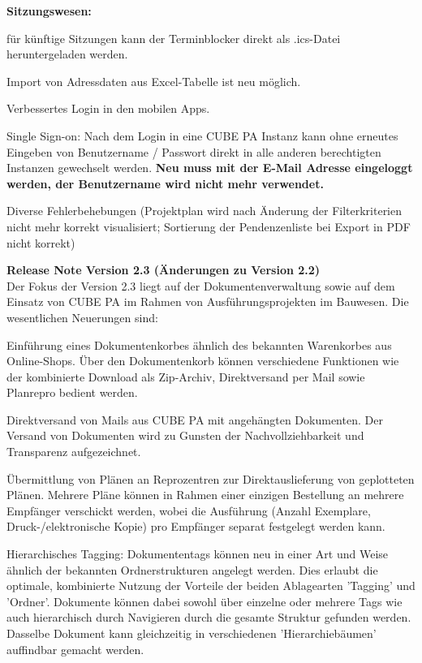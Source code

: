\textbf{Sitzungswesen:}
\begin{compactitem}
  \item für künftige Sitzungen kann der Terminblocker direkt als .ics-Datei heruntergeladen werden.
	\item Import von Adressdaten aus Excel-Tabelle ist neu möglich.
	\item Verbessertes Login in den mobilen Apps.
	\item Single Sign-on: Nach dem Login in eine CUBE PA Instanz kann ohne erneutes Eingeben von Benutzername / Passwort direkt in alle anderen berechtigten Instanzen gewechselt werden. \textbf{Neu muss mit der E-Mail Adresse eingeloggt werden, der Benutzername wird nicht mehr verwendet.}
	\item Diverse Fehlerbehebungen (Projektplan wird nach Änderung der Filterkriterien nicht mehr korrekt visualisiert; Sortierung der Pendenzenliste bei Export in PDF nicht korrekt)	
\end{compactitem}

\vspace{\baselineskip}

\textbf{Release Note Version 2.3 (Änderungen zu Version 2.2)} \\
Der Fokus der Version 2.3 liegt auf der Dokumentenverwaltung sowie auf dem Einsatz von CUBE PA im Rahmen von Ausführungsprojekten im Bauwesen. Die wesentlichen Neuerungen sind:

\begin{compactitem}
	\item Einführung eines Dokumentenkorbes ähnlich des bekannten Warenkorbes aus Online-Shops. Über den Dokumentenkorb können verschiedene Funktionen wie der kombinierte Download als Zip-Archiv, Direktversand per Mail sowie Planrepro bedient werden.
	\item Direktversand von Mails aus CUBE PA mit angehängten Dokumenten. Der Versand von Dokumenten wird zu Gunsten der Nachvollziehbarkeit und Transparenz aufgezeichnet.
	\item Übermittlung von Plänen an Reprozentren zur Direktauslieferung von geplotteten Plänen. Mehrere Pläne können in Rahmen einer einzigen Bestellung an mehrere Empfänger verschickt werden, wobei die Ausführung (Anzahl Exemplare, Druck-/elektronische Kopie) pro Empfänger separat festgelegt werden kann.
	\item Hierarchisches Tagging: Dokumententags können neu in einer Art und Weise ähnlich der bekannten Ordnerstrukturen angelegt werden. Dies erlaubt die optimale, kombinierte Nutzung der Vorteile der beiden Ablagearten 'Tagging' und 'Ordner'. Dokumente können dabei sowohl über einzelne oder mehrere Tags wie auch hierarchisch durch Navigieren durch die gesamte Struktur gefunden werden. Dasselbe Dokument kann gleichzeitig in verschiedenen 'Hierarchiebäumen' auffindbar gemacht werden.
	
\end{compactitem}

